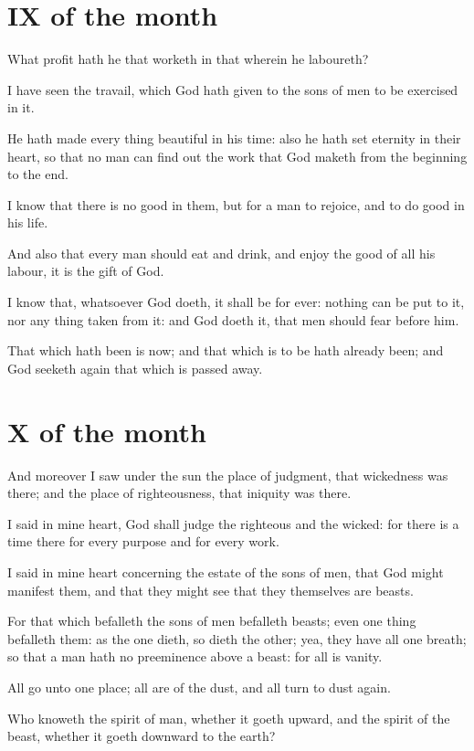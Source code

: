 \section{IX of the month}

What profit hath he that worketh in that wherein he laboureth?

I have seen the travail, which God hath given to the sons of men to be exercised in it.

\verseamended He hath made every thing beautiful in his time: also he hath set eternity in their heart, so that no man can find out the work that God maketh from the beginning to the end.

I know that there is no good in them, but for a man to rejoice, and to do good in his life.

And also that every man should eat and drink, and enjoy the good of all his labour, it is the gift of God.

I know that, whatsoever God doeth, it shall be for ever: nothing can be put to it, nor any thing taken from it: and God doeth it, that men should fear before him.

\verseamended That which hath been is now; and that which is to be hath already been; and God seeketh again that which is passed away.

\section{X of the month}

And moreover I saw under the sun the place of judgment, that wickedness was there; and the place of righteousness, that iniquity was there.

I said in mine heart, God shall judge the righteous and the wicked: for there is a time there for every purpose and for every work.

I said in mine heart concerning the estate of the sons of men, that God might manifest them, and that they might see that they themselves are beasts.

For that which befalleth the sons of men befalleth beasts; even one thing befalleth them: as the one dieth, so dieth the other; yea, they have all one breath; so that a man hath no preeminence above a beast: for all is vanity.

All go unto one place; all are of the dust, and all turn to dust again.

\verseamended Who knoweth the spirit of man, whether it goeth upward, and the spirit of the beast, whether it goeth downward to the earth?

